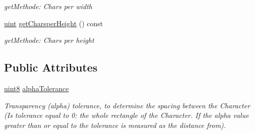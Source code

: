 \begin{DoxyCompactItemize}
\begin{DoxyCompactList}\small\item\em getMethode: Chars per width \item\end{DoxyCompactList}\item 
\hypertarget{class_f2_c_1_1_t_t_f_font_a2bdf2324ba640d46b3e37cb3f8e5d862}{
\hyperlink{namespace_f2_c_a58be2bac9eb3e3c99cb41b6008bf4fae}{uint} \hyperlink{class_f2_c_1_1_t_t_f_font_a2bdf2324ba640d46b3e37cb3f8e5d862}{getCharsperHeight} () const }
\label{class_f2_c_1_1_t_t_f_font_a2bdf2324ba640d46b3e37cb3f8e5d862}

\begin{DoxyCompactList}\small\item\em getMethode: Chars per height \item\end{DoxyCompactList}\end{DoxyCompactItemize}
\subsection*{Public Attributes}
\begin{DoxyCompactItemize}
\item 
\hypertarget{class_f2_c_1_1_t_t_f_font_a11f7ab013a676988b25b16a2dcc2d8f0}{
\hyperlink{namespace_f2_c_a711deb33697d145669b9c0c4fe87c7ca}{uint8} \hyperlink{class_f2_c_1_1_t_t_f_font_a11f7ab013a676988b25b16a2dcc2d8f0}{alphaTolerance}}
\label{class_f2_c_1_1_t_t_f_font_a11f7ab013a676988b25b16a2dcc2d8f0}

\begin{DoxyCompactList}\small\item\em Transparency (alpha) tolerance, to determine the spacing between the Character (Is tolerance equal to 0: the whole rectangle of the Character. If the alpha value greater than or equal to the tolerance is measured as the distance from). \item\end{DoxyCompactList}\end{DoxyCompactItemize}
